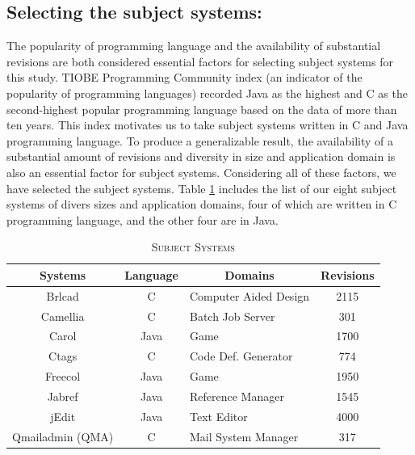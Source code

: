 \documentclass[review]{elsarticle}
\begin{document}
\subsection{Selecting the subject systems:} 
The popularity of programming language and the availability of substantial revisions are both considered essential factors for selecting subject systems for this study. TIOBE Programming Community index \cite{TIOBE2019} (an indicator of the popularity of programming languages) recorded Java as the highest and C as the second-highest popular programming language based on the data of more than ten years. This index motivates us to take subject systems written in C and Java programming language. To produce a generalizable result, the availability of a substantial amount of revisions and diversity in size and application domain is also an essential factor for subject systems. Considering all of these factors, we have selected the subject systems. Table \ref{tab:subject-systems-cc} includes the list of our eight subject systems of divers sizes and application domains, four of which are written in C programming language, and the other four are in Java. 

\begin{table}[htbp] 
\caption{\label{tab:subject-systems-cc}\textsc{Subject Systems}}
\centering
\begin{tabular}{|c|c|l|c|}
\hline
\textbf{Systems} & \textbf{Language} & \multicolumn{1}{c|}{\textbf{Domains}} & \textbf{Revisions} \\ \hline \hline
Brlcad           & C              & Computer Aided Design                 & 2115               \\ \hline
Camellia         & C              & Batch Job Server                      & 301                \\ \hline
Carol            & Java           & Game                                  & 1700               \\ \hline
Ctags            & C              & Code Def. Generator                   & 774                \\ \hline
Freecol          & Java           & Game                                  & 1950               \\ \hline
Jabref           & Java           & Reference Manager                     & 1545               \\ \hline
jEdit            & Java           & Text Editor                           & 4000               \\ \hline
Qmailadmin (QMA)       & C              & Mail System Manager                   & 317                \\ \hline
\end{tabular}
\end{table}
\end{document}
